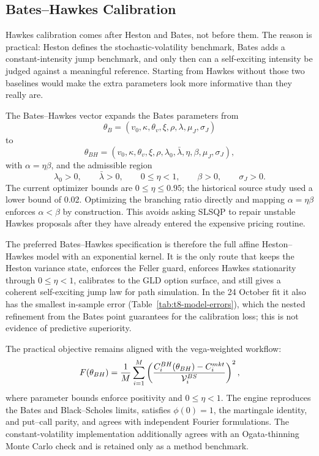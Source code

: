 \subsection{Bates--Hawkes Calibration}
\label{sec:bates-hawkes-calibration}

Hawkes calibration comes after Heston and Bates, not before them. The reason is practical: Heston defines the stochastic-volatility benchmark, Bates adds a constant-intensity jump benchmark, and only then can a self-exciting intensity be judged against a meaningful reference. Starting from Hawkes without those two baselines would make the extra parameters look more informative than they really are.

The Bates--Hawkes vector expands the Bates parameters from
\[
    \theta_B=(v_0,\kappa,\theta_v,\xi,\rho,\lambda,\mu_J,\sigma_J)
\]
to
\[
    \theta_{BH}
    =
    (v_0,\kappa,\theta_v,\xi,\rho,\lambda_0,\bar{\lambda},\eta,\beta,\mu_J,\sigma_J),
\]
with \(\alpha=\eta\beta\), and the admissible region
\[
    \lambda_0>0,\qquad \bar{\lambda}>0,\qquad 0\leq \eta<1,\qquad \beta>0,\qquad \sigma_J>0.
\]
The current optimizer bounds are \(0\leq\eta\leq0.95\); the historical source study used a lower bound of 0.02. Optimizing the branching ratio directly and mapping \(\alpha=\eta\beta\) enforces \(\alpha<\beta\) by construction. This avoids asking SLSQP to repair unstable Hawkes proposals after they have already entered the expensive pricing routine.

The preferred Bates--Hawkes specification is therefore the full affine Heston--Hawkes model with an exponential kernel. It is the only route that keeps the Heston variance state, enforces the Feller guard, enforces Hawkes stationarity through \(0\leq \eta<1\), calibrates to the GLD option surface, and still gives a coherent self-exciting jump law for path simulation. In the 24 October fit it also has the smallest in-sample error (Table~\ref{tab:t8-model-errors}), which the nested refinement from the Bates point guarantees for the calibration loss; this is not evidence of predictive superiority.

The practical objective remains aligned with the vega-weighted workflow:
\begin{equation}
    F(\theta_{BH})
    =
    \frac{1}{M}\sum_{i=1}^M
    \left(
        \frac{C_i^{BH}(\theta_{BH})-C_i^{mkt}}{\mathcal{V}_i^{BS}}
    \right)^2,
\end{equation}
where parameter bounds enforce positivity and \(0\leq \eta<1\). The engine reproduces the Bates and Black--Scholes limits, satisfies \(\phi(0)=1\), the martingale identity, and put--call parity, and agrees with independent Fourier formulations. The constant-volatility implementation additionally agrees with an Ogata-thinning~\cite{Ogata1981} Monte Carlo check and is retained only as a method benchmark.

